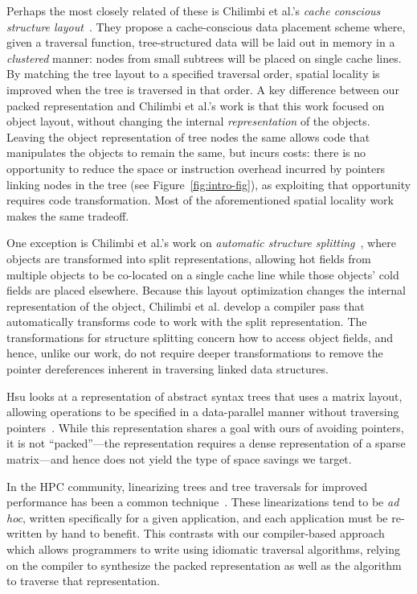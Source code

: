 \documentclass[a4paper,english]{lipics-v2016}
\begin{document}
Perhaps the most closely related of these is Chilimbi et al.'s {\em cache
conscious structure layout}~\cite{Chilimbi1999}. They propose a
cache-conscious data placement scheme where, given a traversal function,
tree-structured data will be laid out in memory in a {\em clustered} manner:
nodes from small subtrees will be placed on single cache lines. By matching
the tree layout to a specified traversal order, spatial locality is improved
when the tree is traversed in that order. A key difference between our packed
representation and Chilimbi et al.'s work is that this work focused on object
layout, without changing the internal {\em representation} of the objects.
Leaving the object representation of tree nodes the same allows code that
manipulates the objects to remain the same, but incurs costs: there is no
opportunity to reduce the space or instruction overhead incurred by pointers
linking nodes in the tree (see Figure~\ref{fig:intro-fig}), as exploiting that
opportunity requires code transformation. Most of the aforementioned spatial
locality work makes the same tradeoff.

One exception is Chilimbi et al.'s work on {\em automatic structure
splitting}~\cite{Chilimbi1999b}, where objects are transformed into split
representations, allowing hot fields from multiple objects to be co-located on
a single cache line while those objects' cold fields are placed elsewhere.
Because this layout optimization changes the internal representation of the
object, Chilimbi et al. develop a compiler pass that automatically transforms
code to work with the split representation. The transformations for structure
splitting concern how to access object fields, and hence, unlike our work, do
not require deeper transformations to remove the pointer dereferences inherent
in traversing linked data structures.

Hsu looks at a representation of abstract syntax trees that uses a matrix
layout, allowing operations to be specified in a data-parallel manner without
traversing pointers~\cite{hsu2016key}. While this representation shares a goal
with ours of avoiding pointers, it is not ``packed''---the representation
requires a dense representation of a sparse matrix---and hence does not yield
the type of space savings we target.

In the HPC community, linearizing trees and tree traversals for improved
performance has been a common technique~\cite{makino90,goldfarb13sc}. These
linearizations tend to be {\em ad hoc}, written specifically for a given
application, and each application must be re-written by hand to benefit. This
contrasts with our compiler-based approach which allows programmers to write
using idiomatic traversal algorithms, relying on the compiler to synthesize
the packed representation as well as the algorithm to traverse that
representation.
\end{document}
